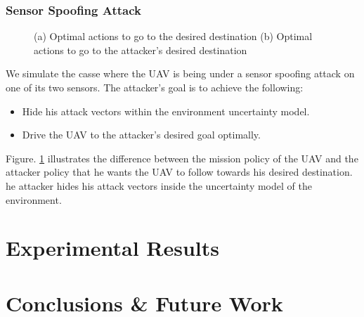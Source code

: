 \documentclass[letterpaper, 10 pt, conference]{ieeeconf}  %
\begin{document}
\subsubsection{Sensor Spoofing Attack}
\begin{figure}[]
	\centering
	\caption{(a) Optimal actions to go to the desired destination (b) Optimal actions to go to the attacker's desired destination}
	\label{fig:policies}
\end{figure}
We simulate the casse where the UAV is being under a sensor spoofing attack on one of its two sensors. The attacker's goal is to achieve the following:
\begin{itemize}
    \item Hide his attack vectors within the environment uncertainty model.
    \item Drive the UAV to the attacker's desired goal optimally.
\end{itemize}
Figure. \ref{fig:policies} illustrates the difference between the mission policy of the UAV and the attacker policy that he wants the UAV to follow towards his desired destination.
he attacker hides his attack vectors inside the uncertainty model of the environment. 
\section{Experimental Results}\label{sec:exp}
\section{Conclusions \& Future Work}\label{sec:conclusion}
\end{document}
